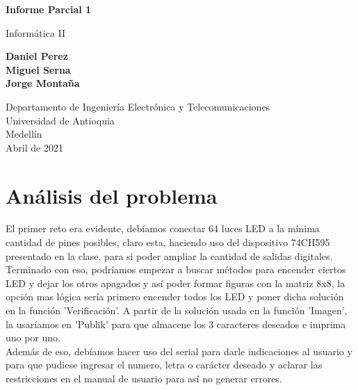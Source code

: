 \documentclass{article}
\begin{document}
\begin{titlepage}
    \begin{center}
        \vspace*{1cm}
            
        \Huge
        \textbf{Informe Parcial 1}
            
        \vspace{0.5cm}
        \LARGE
        Informática II
            
        \vspace{1.5cm}
            
        \textbf{Daniel Perez\\Miguel Serna\\Jorge Montaña}
            
        \vfill
            
        \vspace{0.8cm}
            
        \Large
        Departamento de Ingeniería Electrónica y Telecomunicaciones\\
        Universidad de Antioquia\\
        Medellín\\
        Abril de 2021
            
    \end{center}
\end{titlepage}

\tableofcontents

\section{Análisis del problema}
El primer reto era evidente, debíamos conectar 64 luces LED a la mínima cantidad de pines posibles, claro esta, haciendo uso del dispositivo 74CH595 presentado en la clase, para si poder ampliar la cantidad de salidas digitales.\\

Terminado con eso, podríamos empezar a buscar métodos para encender ciertos LED y dejar los otros apagados y así poder formar figuras con la matriz 8x8, la opción mas lógica sería primero encender todos los LED y poner dicha solución en la función 'Verificación'. A partir de la solución usada en la función 'Imagen', la usaríamos en 'Publik' para que almacene los 3 caracteres deseados e imprima uno por uno.\\

Además de eso, debíamos hacer uso del serial para darle indicaciones al usuario y para que pudiese ingresar el numero, letra o carácter deseado y  aclarar las restricciones en el manual de usuario para así no generar errores.
\end{document}

